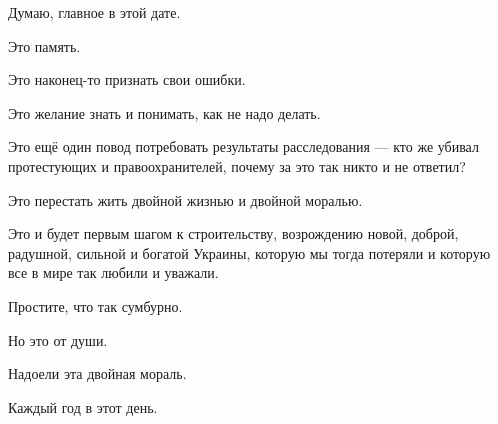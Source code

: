 Думаю, главное в этой дате.

Это память.

Это наконец-то признать свои ошибки.

Это желание знать и понимать, как не надо делать.

Это ещё один повод потребовать результаты расследования — кто же убивал
протестующих и правоохранителей, почему за это так никто и не ответил?

Это перестать жить двойной жизнью и двойной моралью.

Это и будет первым шагом к строительству, возрождению новой, доброй, радушной,
сильной и богатой Украины, которую мы тогда потеряли и которую все в мире так
любили и уважали.

Простите, что так сумбурно.

Но это от души.

Надоели эта двойная мораль.

Каждый год в этот день.
